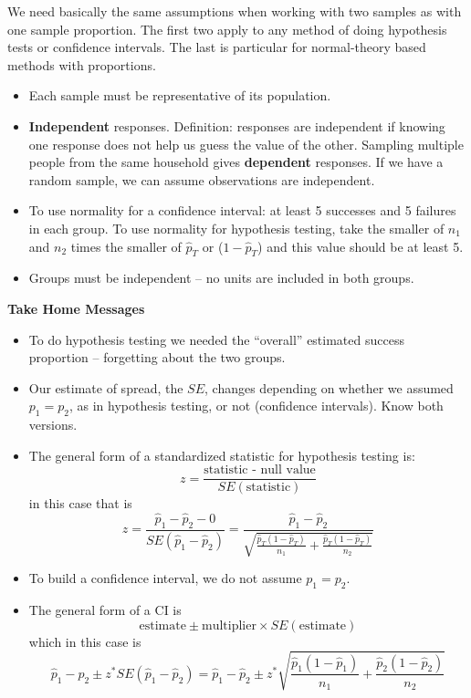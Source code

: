  We need basically the same assumptions when working with two samples
  as with one sample proportion.  The first two apply to any method
  of doing hypothesis tests or confidence intervals.  The last is
  particular for normal-theory based methods with proportions. 
  \begin{itemize}
     \item Each sample must be representative of its population. 
     \item {\bf Independent} responses.  Definition: responses are
       independent if knowing one response does not help us guess the
       value of the other.  Sampling multiple people from the same
       household gives {\bf dependent} responses.  If we have a random
       sample, we can assume observations are independent.
     \item To use normality for a confidence interval: at least 5
       successes and 5 failures in each group.  To use normality for
       hypothesis testing, take the smaller of $n_1$ and $n_2$ times
       the smaller of $\widehat{p}_T$ or ($1-\widehat{p}_T$) and this
       value should be at least 5.\vspace{1in}
     \item Groups must be independent -- no units are included in both
       groups. 
  \end{itemize}



\begin{center}
  {\large\bf Take Home Messages}
\end{center}

\begin{itemize}
 \item  To do hypothesis testing we needed the ``overall'' estimated
   success proportion -- forgetting about the two groups. 
 \item Our estimate of spread, the $SE$, changes depending on whether
   we assumed $p_1=p_2$, as in hypothesis testing, or not (confidence
   intervals). Know both versions.
 \item  The general form of a standardized statistic for hypothesis
   testing is:
     $$z = \frac{\mbox{statistic - null value}}{SE(\mbox{statistic})}$$
in this case that is
$$ z = \frac{\widehat{p}_1 - \widehat{p}_2 -0}{ SE(\widehat{p}_1 -
  \widehat{p}_2)} = \frac{\widehat{p}_1 - \widehat{p}_2} 
   {\sqrt{\frac{\widehat{p}_T(1-\widehat{p}_T)}{n_1} +
    \frac{\widehat{p}_T(1-\widehat{p}_T)}{n_2}}}$$
\item To build a confidence interval, we do not assume ${p}_1 ={p}_2$.
\item The general form of a CI is
$$ \mbox{estimate} \pm \mbox{multiplier} \times SE(\mbox{estimate})$$
    which in this case is
  $$ \widehat{p}_1 - \widehat{p}_2 \pm z^* SE(\widehat{p}_1 -
  \widehat{p}_2) = \widehat{p}_1 - \widehat{p}_2 \pm z^* 
\sqrt{\frac{\widehat{p}_1(1 - \widehat{p}_1)}{n_1} + 
      \frac{\widehat{p}_2(1 - \widehat{p}_2)}{n_2}}$$
\end{itemize}\vfill




